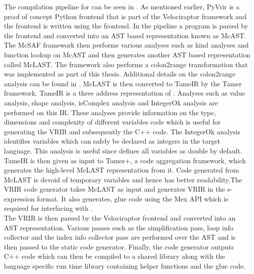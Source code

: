 The compilation pipeline for \velocty can be seen in . As mentioned earlier, PyVrir is a proof of concept Python frontend that is part of the Velociraptor framework and the \matlab frontend is written using the \mclab frontend. In the \mclab pipeline a \matlab program is parsed by the \mclab frontend and converted into an AST based representation known as McAST. The McSAF\cite{doherty11} framework then performs various analyses such as kind analyses and function lookup on McAST and then generates another AST based representation called McLAST. The framework also performs a colon2range transformation that was implemented as part of this thesis. Additional details on the colon2range analysis can be found in . McLAST is then converted to TameIR\cite{Dubrau:2012} by the Tamer framework. TameIR is a three address representation of \matlab. Analyses such as value analysis, shape analysis, isComplex analysis and IntegerOk analysis are performed on this IR. These analyses provide information on the type, dimensions and complexity of different variables code which is useful for generating the VRIR and subsequently the C++ code. The IntegerOk analysis identifies variables which can safely be declared as integers in the target language. This analysis is useful since \matlab defines all variables as double by default. TameIR is then given as input to Tamer+, a code aggregation framework, which generates the high-level McLAST representation from it. Code generated from McLAST is devoid of temporary variables and hence has better readability.The VRIR code generator takes McLAST as input and generates VRIR in the s-expression format. It also generates, glue code using the \matlab Mex\cite{mex} API which is required for interfacing with \matlab.\\ 
The VRIR is then parsed by the Velociraptor frontend and converted into an AST representation. Various passes such as the simplification pass, loop info collector and the index info collector pass are performed over the AST and is then passed to the static code generator. Finally, the code generator outputs C++ code which can then be compiled to a shared library along with the language specific run time library containing helper functions and the glue code. 
